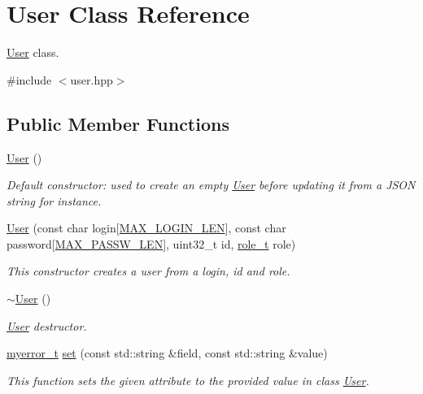 \hypertarget{classUser}{}\section{User Class Reference}
\label{classUser}


\hyperlink{classUser}{User} class.  




{\ttfamily \#include $<$user.\+hpp$>$}

\subsection*{Public Member Functions}
\begin{DoxyCompactItemize}
\item 
\hyperlink{classUser_a4a0137053e591fbb79d9057dd7d2283d}{User} ()
\begin{DoxyCompactList}\small\item\em Default constructor\+: used to create an empty \hyperlink{classUser}{User} before updating it from a J\+S\+O\+N string for instance. \end{DoxyCompactList}\item 
\hyperlink{classUser_af73f47c010d55a777fe1cc9bc21e0a50}{User} (const char login\mbox{[}\hyperlink{user_8hpp_a43842dcd60d621d7d9c9b9e4ecd76f78}{M\+A\+X\+\_\+\+L\+O\+G\+I\+N\+\_\+\+L\+E\+N}\mbox{]}, const char password\mbox{[}\hyperlink{user_8hpp_a510de8d20fed46d05c63ed414e8b595f}{M\+A\+X\+\_\+\+P\+A\+S\+S\+W\+\_\+\+L\+E\+N}\mbox{]}, uint32\+\_\+t id, \hyperlink{user_8hpp_a147824aa4797bb7a9bcf276b5de0cb7c}{role\+\_\+t} role)
\begin{DoxyCompactList}\small\item\em This constructor creates a user from a login, id and role. \end{DoxyCompactList}\item 
\hyperlink{classUser_ac00b72ad64eb4149f7b21b9f5468c2b2}{$\sim$\+User} ()
\begin{DoxyCompactList}\small\item\em \hyperlink{classUser}{User} destructor. \end{DoxyCompactList}\item 
\hyperlink{error_8hpp_acabd2917084445509becf54ab64a4bd0}{myerror\+\_\+t} \hyperlink{classUser_ad20b07e9b43647d65e7384d3002bc4cf}{set} (const std\+::string \&field, const std\+::string \&value)
\begin{DoxyCompactList}\small\item\em This function sets the given attribute to the provided value in class \hyperlink{classUser}{User}. \end{DoxyCompactList}\item 

\end{DoxyCompactItemize}
